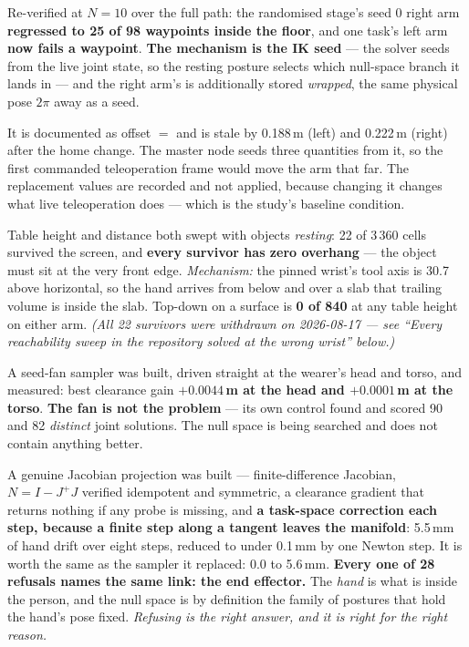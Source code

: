 {Re-verified at $N=10$ over the full path: the randomised stage's seed 0 right
arm \textbf{regressed to 25 of 98 waypoints inside the floor}, and one task's
left arm \textbf{now fails a waypoint}. \textbf{The mechanism is the IK seed}
--- the solver seeds from the live joint state, so the resting posture selects
which null-space branch it lands in --- and the right arm's  is
additionally stored \emph{wrapped}, the same physical pose $2\pi$ away as a
seed.}

{It is documented as offset $=$  and is stale by 0.188\,m (left)
and 0.222\,m (right) after the home change. The master node seeds three
quantities from it, so the first commanded teleoperation frame would move the
arm that far. The replacement values are recorded and not applied, because
changing it changes what live teleoperation does --- which is the study's
baseline condition.}

{Table height and distance both swept with objects \emph{resting}: 22 of 3\,360
cells survived the screen, and \textbf{every survivor has zero overhang} ---
the object must sit at the very front edge. \textit{Mechanism:} the pinned
wrist's tool axis is 30.7\dg{} above horizontal, so the hand arrives from below
and over a slab that trailing volume is inside the slab. Top-down on a surface
is \textbf{0 of 840} at any table height on either arm. \emph{(All 22 survivors were withdrawn on 2026-08-17 --- see ``Every reachability sweep in the repository solved at the wrong wrist'' below.)}}

{A seed-fan sampler was built, driven straight at the wearer's head and torso,
and measured: best clearance gain \textbf{$+0.0044$\,m at the head and
$+0.0001$\,m at the torso}. \textbf{The fan is not the problem} --- its own
control found and scored 90 and 82 \emph{distinct} joint solutions. The null
space is being searched and does not contain anything better.}

{A genuine Jacobian projection was built --- finite-difference Jacobian,
$N = I - J^{+}J$ verified idempotent and symmetric, a clearance gradient that
returns nothing if any probe is missing, and \textbf{a task-space correction
each step, because a finite step along a tangent leaves the manifold}: 5.5\,mm
of hand drift over eight steps, reduced to under 0.1\,mm by one Newton step.
It is worth the same as the sampler it replaced: 0.0 to 5.6\,mm.
\textbf{Every one of 28 refusals names the same link: the end effector.} The
\emph{hand} is what is inside the person, and the null space is by definition
the family of postures that hold the hand's pose fixed. \textit{Refusing is the
right answer, and it is right for the right reason.}}

